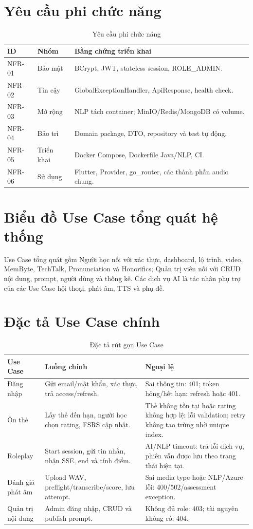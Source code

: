 \documentclass[12pt,a4paper]{report}
\begin{document}
\section{Yêu cầu phi chức năng}
\begin{longtable}{p{}p{}p{}}
\caption{Yêu cầu phi chức năng}\label{tab:nfr}\\\toprule
ID & Nhóm & Bằng chứng triển khai\\\midrule
NFR-01 & Bảo mật & BCrypt, JWT, stateless session, ROLE\_ADMIN.\\
NFR-02 & Tin cậy & GlobalExceptionHandler, ApiResponse, health check.\\
NFR-03 & Mở rộng & NLP tách container; MinIO/Redis/MongoDB có volume.\\
NFR-04 & Bảo trì & Domain package, DTO, repository và test tự động.\\
NFR-05 & Triển khai & Docker Compose, Dockerfile Java/NLP, CI.\\
NFR-06 & Sử dụng & Flutter, Provider, go\_router, các thành phần audio chung.\\
\bottomrule
\end{longtable}

\section{Biểu đồ Use Case tổng quát hệ thống}
Use Case tổng quát gồm Người học nối với xác thực, dashboard, lộ trình, video, MemByte, TechTalk, Pronunciation và Honorifics; Quản trị viên nối với CRUD nội dung, prompt, người dùng và thống kê. Các dịch vụ AI là tác nhân phụ trợ của các Use Case hội thoại, phát âm, TTS và phụ đề.

\section{Đặc tả Use Case chính}
\begin{longtable}{p{}p{}p{}}
\caption{Đặc tả rút gọn Use Case}\toprule
Use Case & Luồng chính & Ngoại lệ\\\midrule
Đăng nhập & Gửi email/mật khẩu, xác thực, trả access/refresh. & Sai thông tin: 401; token hỏng/hết hạn: refresh hoặc 401.\\
Ôn thẻ & Lấy thẻ đến hạn, người học chọn rating, FSRS cập nhật. & Thẻ không tồn tại hoặc rating không hợp lệ: lỗi validation; retry không tạo trùng nhờ unique index.\\
Roleplay & Start session, gửi tin nhắn, nhận SSE, end và tính điểm. & AI/NLP timeout: trả lỗi dịch vụ, phiên vẫn được lưu theo trạng thái hiện tại.\\
Đánh giá phát âm & Upload WAV, preflight/transcribe/score, lưu attempt. & Sai media type hoặc NLP/Azure lỗi: 400/502/assessment exception.\\
Quản trị nội dung & Admin đăng nhập, CRUD và publish prompt. & Không đủ role: 403; tài nguyên không có: 404.\\
\bottomrule
\end{longtable}
\end{document}
